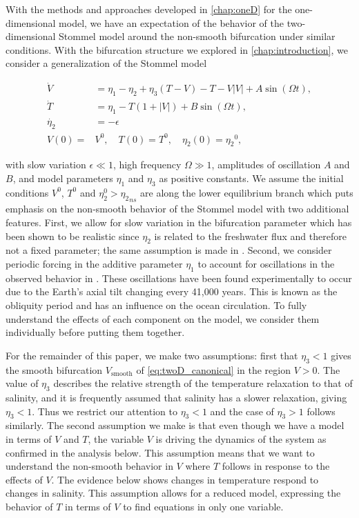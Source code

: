 With the methods and approaches developed in \autoref{chap:oneD} for the one-dimensional model, we have an expectation of the behavior of the two-dimensional Stommel model around the non-smooth bifurcation under similar conditions. With the bifurcation structure we explored in \autoref{chap:introduction}, we consider a generalization of the Stommel model

\begin{equation}\label{eq:twoD_canonical}
  \begin{aligned}
   \dot{V} & =  \eta_1-\eta_2+\eta_3(T-V)-T-V|V|+A\sin(\Omega t), \\
   \dot{T}     & =  \eta_1-T(1+|V|)+B\sin(\Omega t),  \\
  \dot{\eta_2}  & =  -\epsilon\\
  V(0)=&V^0,\quad T(0)=T^0, \quad \eta_2(0)={\eta_2}^0,
  \end{aligned}
\end{equation}

with slow variation $\epsilon\ll 1$, high frequency $\Omega\gg 1$, amplitudes of oscillation $A$ and $B$, and model parameters $\eta_1$ and $\eta_3$ as positive constants. We assume the initial conditions $V^0$, $T^0$ and $\eta_2^0>{\eta_2}_{ns}$ are along the lower equilibrium branch which puts emphasis on the non-smooth behavior of the Stommel model with two additional features. First, we allow for slow variation in the bifurcation parameter which has been shown to be realistic since $\eta_2$ is related to the freshwater flux and therefore not a fixed parameter; the same assumption is made in \cite{roberts2017relaxation}. Second, we consider periodic forcing in the additive parameter $\eta_1$ to account for oscillations in the observed behavior in \cite{huybers2005obliquity}. These oscillations have been found experimentally to occur due to the Earth's axial tilt changing every 41,000 years. This is known as the obliquity period and has an influence on the ocean circulation. To fully understand the effects of each component on the model, we consider them individually before putting them together.

For the remainder of this paper, we make two assumptions: first that $\eta_3<1$ gives the smooth bifurcation $V_{\text{smooth}}$ of \eqref{eq:twoD_canonical} in the region $V>0$. The value of $\eta_3$ describes the relative strength of the temperature relaxation to that of salinity, and it is frequently assumed that salinity has a slower relaxation, giving $\eta_3<1$. Thus we restrict our attention to $\eta_3<1$ and the case of $\eta_3>1$ follows similarly. The second assumption we make is that even though we have a model in terms of $V$ and $T$, the variable $V$ is driving the dynamics of the system as confirmed in the analysis below. This assumption means that we want to understand the non-smooth behavior in $V$ where $T$ follows in response to the effects of $V$. The evidence below shows changes in temperature respond to changes in salinity. This assumption allows for a reduced model, expressing the behavior of $T$ in terms of $V$ to find equations in only one variable.

